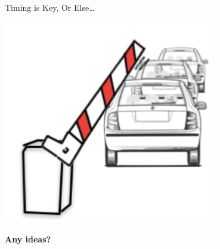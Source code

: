 \documentclass[aspectratio=169, 11pt, handout]{beamer}
\begin{document}
\begin{frame}{Timing is Key, Or Else\ldots}
    
\begin{center}
    \includegraphics[width=0.7\textwidth]{latch_cars_issue.png}
\end{center}
\end{frame}



\begin{frame}{}
      \begin{center}
    {\color{sigma@mainblue} \bfseries Any ideas?}
  \end{center}
\end{frame}
\end{document}
